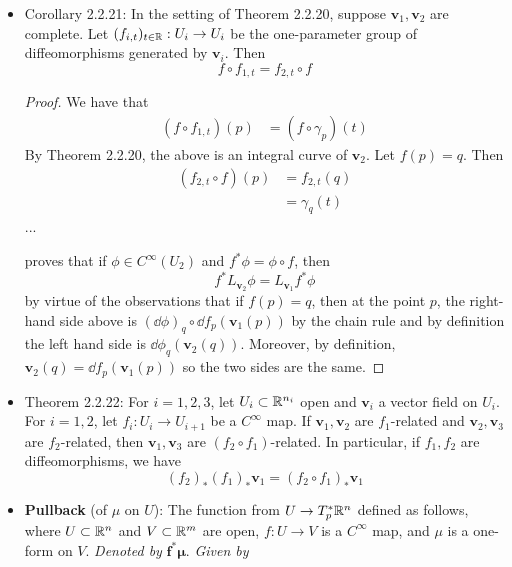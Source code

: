 \documentclass[../notes.tex]{subfiles}
\begin{document}
\begin{itemize}
\begin{proof}
\begin{align*}
            &= \left( (f\circ\gamma)(t),\eval{\textstyle\dv{t}(f\circ\gamma)}_t \right)
        \end{align*}
        as desired.
    \end{proof}
    \item Corollary 2.2.21: In the setting of Theorem 2.2.20, suppose $\bm{v}_1,\bm{v}_2$ are complete. Let $(f_{i,t})_{t\in\mathbb{R}}:U_i\to U_i$ be the one-parameter group of diffeomorphisms generated by $\bm{v}_i$. Then
    \begin{equation*}
        f\circ f_{1,t} = f_{2,t}\circ f
    \end{equation*}
    \begin{proof}
        We have that
        \begin{align*}
            (f\circ f_{1,t})(p) &= (f\circ\gamma_p)(t)
        \end{align*}
        By Theorem 2.2.20, the above is an integral curve of $\bm{v}_2$. Let $f(p)=q$. Then
        \begin{align*}
            (f_{2,t}\circ f)(p) &= f_{2,t}(q)\\
            &= \gamma_q(t)
        \end{align*}
        ...\par
        \textcite{bib:DifferentialForms} proves that if $\phi\in C^\infty(U_2)$ and $f^*\phi=\phi\circ f$, then
        \begin{equation*}
            f^*L_{\bm{v}_2}\phi = L_{\bm{v}_1}f^*\phi
        \end{equation*}
        by virtue of the observations that if $f(p)=q$, then at the point $p$, the right-hand side above is $(\dd\phi)_q\circ\dd f_p(\bm{v}_1(p))$ by the chain rule and by definition the left hand side is $\dd\phi_q(\bm{v}_2(q))$. Moreover, by definition, $\bm{v}_2(q)=\dd f_p(\bm{v}_1(p))$ so the two sides are the same.
    \end{proof}
    \item Theorem 2.2.22: For $i=1,2,3$, let $U_i\subset\mathbb{R}^{n_i}$ open and $\bm{v}_i$ a vector field on $U_i$. For $i=1,2$, let $f_i:U_i\to U_{i+1}$ be a $C^\infty$ map. If $\bm{v}_1,\bm{v}_2$ are $f_1$-related and $\bm{v}_2,\bm{v}_3$ are $f_2$-related, then $\bm{v}_1,\bm{v}_3$ are $(f_2\circ f_1)$-related. In particular, if $f_1,f_2$ are diffeomorphisms, we have
    \begin{equation*}
        (f_2)_*(f_1)_*\bm{v}_1 = (f_2\circ f_1)_*\bm{v}_1
    \end{equation*}
    \item \textbf{Pullback} (of $\mu$ on $U$): The function from $U\to T_p^*\mathbb{R}^n$ defined as follows, where $U\subset\mathbb{R}^n$ and $V\subset\mathbb{R}^m$ are open, $f:U\to V$ is a $C^\infty$ map, and $\mu$ is a one-form on $V$. \emph{Denoted by} $\bm{f^*\mu}$. \emph{Given by}

\end{itemize}
\end{document}
